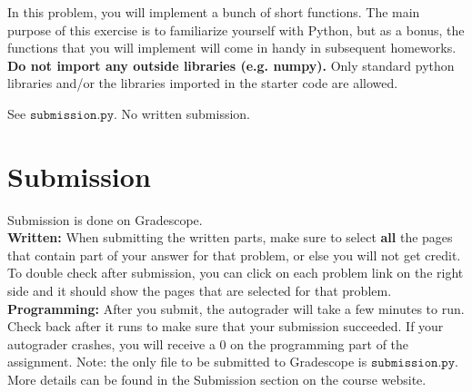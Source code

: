 \documentclass{article}
\theoremstyle{case}
\theoremstyle{definition}
\begin{document}
In this problem, you will implement a bunch of short functions. The main
purpose of this exercise is to familiarize yourself with Python,
but as a bonus, the functions that you will implement will come in handy in
subsequent homeworks. \\

\textbf{Do not import any outside libraries (e.g. numpy).} Only standard python
libraries and/or the libraries imported in the starter code are allowed.

\begin{shaded}
See $\texttt{submission.py}$. No written submission.
\end{shaded}


\section*{Submission}
Submission is done on Gradescope. \\

\textbf{Written:} When submitting the written parts, make sure to select \textbf{all} the pages that contain part of your answer for that problem, or else you will not get credit.
To double check after submission, you can click on each problem link on the right side and it should show the pages that are selected for that problem. \\

\textbf{Programming:} After you submit, the autograder will take a few minutes to run. Check back after it runs to make sure that your submission succeeded. If your autograder crashes, you will receive a 0 on the programming part of the assignment. Note: the only file to be submitted to Gradescope is $\texttt{submission.py}$.\\

More details can be found in the Submission section on the course website.


\newpage
\end{document}

